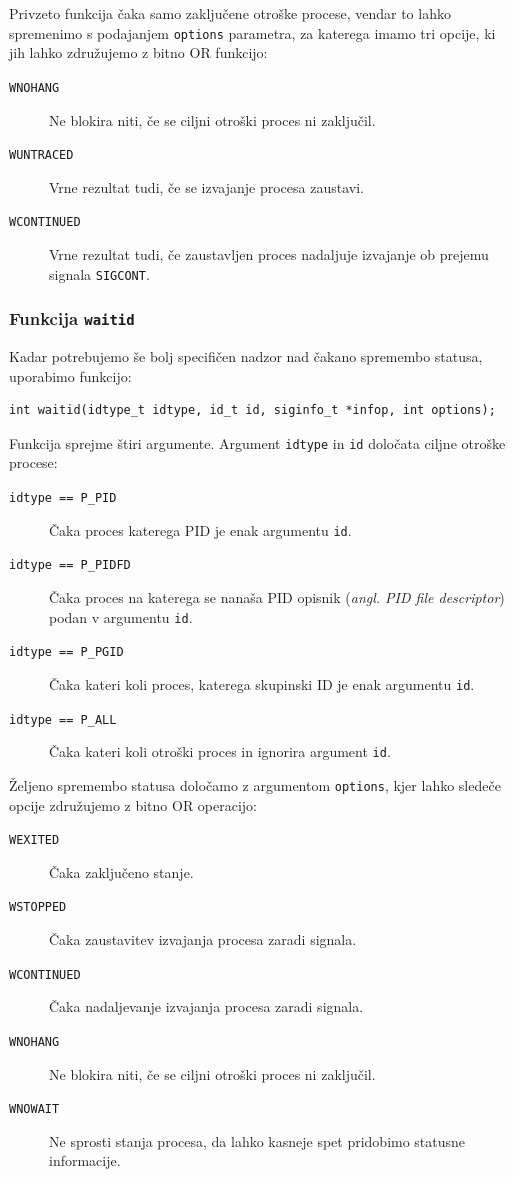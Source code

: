 \documentclass[a4paper,12pt,openright]{book}
\begin{document}
Privzeto funkcija čaka samo zaključene otroške procese, vendar to lahko spremenimo s podajanjem \texttt{options} parametra, za katerega imamo tri opcije, ki jih lahko združujemo z bitno OR funkcijo:
\begin{description}
	\item [\texttt{WNOHANG}] Ne blokira niti, če se ciljni otroški proces ni zaključil.
	\item [\texttt{WUNTRACED}] Vrne rezultat tudi, če se izvajanje procesa zaustavi.
	\item [\texttt{WCONTINUED}] Vrne rezultat tudi, če zaustavljen proces nadaljuje izvajanje ob prejemu signala \texttt{SIGCONT}.
\end{description}

\subsubsection{Funkcija \texttt{waitid}}

Kadar potrebujemo še bolj specifičen nadzor nad čakano spremembo statusa, uporabimo funkcijo:
\begin{lstlisting}[style=func]
	int waitid(idtype_t idtype, id_t id, siginfo_t *infop, int options);
\end{lstlisting}

Funkcija sprejme štiri argumente.
Argument \texttt{idtype} in \texttt{id} določata ciljne otroške procese:
\begin{description}
	\item [\texttt{idtype == P\_PID}] Čaka proces katerega PID je enak argumentu \texttt{id}.
	\item [\texttt{idtype == P\_PIDFD}] Čaka proces na katerega se nanaša PID opisnik (\textit{angl. PID file descriptor}) podan v argumentu \texttt{id}.
	\item [\texttt{idtype == P\_PGID}] Čaka kateri koli proces, katerega skupinski ID je enak argumentu \texttt{id}.
	\item [\texttt{idtype == P\_ALL}] Čaka kateri koli otroški proces in ignorira argument \texttt{id}.
\end{description}

Željeno spremembo statusa določamo z argumentom \texttt{options}, kjer lahko sledeče opcije združujemo z bitno OR operacijo:
\begin{description}
	\item [\texttt{WEXITED}] Čaka zaključeno stanje.
	\item [\texttt{WSTOPPED}] Čaka zaustavitev izvajanja procesa zaradi signala.
	\item [\texttt{WCONTINUED}] Čaka nadaljevanje izvajanja procesa zaradi signala.
	\item [\texttt{WNOHANG}] Ne blokira niti, če se ciljni otroški proces ni zaključil.
	\item [\texttt{WNOWAIT}] Ne sprosti stanja procesa, da lahko kasneje spet pridobimo statusne informacije.
\end{description}
\end{document}
